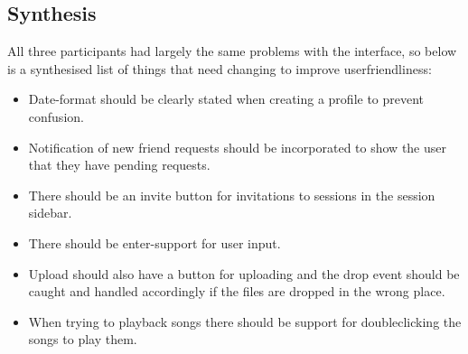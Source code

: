 \subsection{Synthesis}
All three participants had largely the same problems with the interface, so below is a synthesised list of things that need changing to improve userfriendliness:
\begin{itemize}
	\item Date-format should be clearly stated when creating a profile to prevent confusion.
	\item Notification of new friend requests should be incorporated to show the user that they have pending requests.
	\item There should be an invite button for invitations to sessions in the session sidebar.
	\item There should be enter-support for user input. 
	\item Upload should also have a button for uploading and the drop event should be caught and handled accordingly if the files are dropped in the wrong place.
	\item When trying to playback songs there should be support for doubleclicking the songs to play them.
\end{itemize}